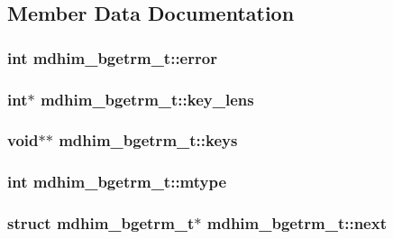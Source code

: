 \subsection{Member Data Documentation}
\hypertarget{structmdhim__bgetrm__t_a42d5a4b81bd9817f4c31348525d53e37}{
\subsubsection[{error}]{\setlength{\rightskip}{0pt plus 5cm}int mdhim\-\_\-bgetrm\-\_\-t\-::error}}\label{structmdhim__bgetrm__t_a42d5a4b81bd9817f4c31348525d53e37}
\hypertarget{structmdhim__bgetrm__t_a4edb37ec3da3413607e3eeda3f224525}{
\subsubsection[{key\-\_\-lens}]{\setlength{\rightskip}{0pt plus 5cm}int$\ast$ mdhim\-\_\-bgetrm\-\_\-t\-::key\-\_\-lens}}\label{structmdhim__bgetrm__t_a4edb37ec3da3413607e3eeda3f224525}
\hypertarget{structmdhim__bgetrm__t_adb7029ca1238649fc6b838e21dc1e1fc}{
\subsubsection[{keys}]{\setlength{\rightskip}{0pt plus 5cm}void$\ast$$\ast$ mdhim\-\_\-bgetrm\-\_\-t\-::keys}}\label{structmdhim__bgetrm__t_adb7029ca1238649fc6b838e21dc1e1fc}
\hypertarget{structmdhim__bgetrm__t_a6d1d78bcd4d55f5341f543246a7636c6}{
\subsubsection[{mtype}]{\setlength{\rightskip}{0pt plus 5cm}int mdhim\-\_\-bgetrm\-\_\-t\-::mtype}}\label{structmdhim__bgetrm__t_a6d1d78bcd4d55f5341f543246a7636c6}
\hypertarget{structmdhim__bgetrm__t_aeb24801d3c8827a0ca7611312e28e568}{
\subsubsection[{next}]{\setlength{\rightskip}{0pt plus 5cm}struct {\bf mdhim\-\_\-bgetrm\-\_\-t}$\ast$ mdhim\-\_\-bgetrm\-\_\-t\-::next}}\label{structmdhim__bgetrm__t_aeb24801d3c8827a0ca7611312e28e568}

